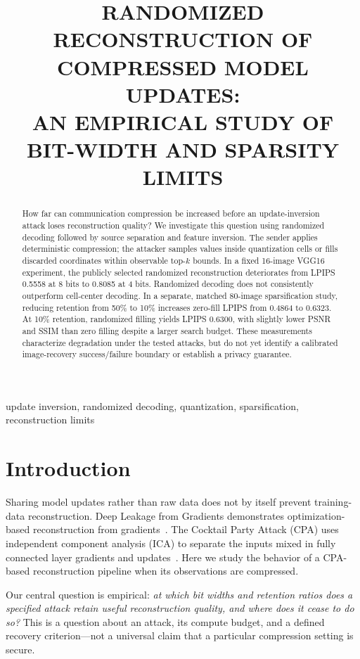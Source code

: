 \documentclass{article}
\title{RANDOMIZED RECONSTRUCTION OF COMPRESSED MODEL UPDATES:\\
AN EMPIRICAL STUDY OF BIT-WIDTH AND SPARSITY LIMITS}
\begin{document}
\maketitle

\begin{abstract}
How far can communication compression be increased before an update-inversion
attack loses reconstruction quality? We investigate this question using
randomized decoding followed by source separation and feature inversion.
The sender applies deterministic compression; the attacker samples values
inside quantization cells or fills discarded coordinates within observable
top-$k$ bounds. In a fixed 16-image VGG16 experiment, the publicly selected
randomized reconstruction deteriorates from LPIPS 0.5558 at 8 bits to 0.8085
at 4 bits. Randomized decoding does not consistently outperform cell-center
decoding. In a separate, matched 80-image sparsification study, reducing
retention from 50\% to 10\% increases zero-fill LPIPS from 0.4864 to 0.6323.
At 10\% retention, randomized filling yields LPIPS 0.6300, with slightly
lower PSNR and SSIM than zero filling despite a larger search budget.
These measurements characterize degradation under the tested attacks, but
do not yet identify a calibrated image-recovery success/failure boundary
or establish a privacy guarantee.
\end{abstract}

\begin{keywords}
update inversion, randomized decoding, quantization, sparsification,
reconstruction limits
\end{keywords}

\section{Introduction}
Sharing model updates rather than raw data does not by itself prevent
training-data reconstruction. Deep Leakage from Gradients demonstrates
optimization-based reconstruction from gradients~\cite{zhu2019deep}.
The Cocktail Party Attack (CPA) uses independent component analysis (ICA)
to separate the inputs mixed in fully connected layer gradients and
updates~\cite{kariyappa2023cocktail}.
Here we study the behavior of a CPA-based reconstruction pipeline when its
observations are compressed.

Our central question is empirical: \emph{at which bit widths and retention
ratios does a specified attack retain useful reconstruction quality, and
where does it cease to do so?} This is a question about an attack, its
compute budget, and a defined recovery criterion---not a universal claim
that a particular compression setting is secure.
\end{document}
